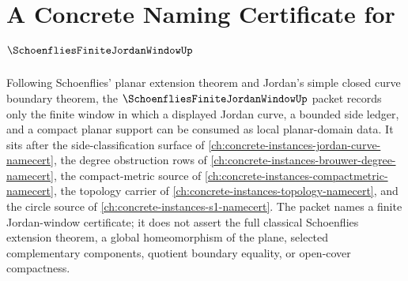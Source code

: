 \chapter{A Concrete Naming Certificate for $\SchoenfliesFiniteJordanWindowUp$}
\label{ch:concrete-instances-schoenflies-finite-jordan-window-namecert}

Following Schoenflies' planar extension theorem and Jordan's simple closed curve boundary theorem, the $\SchoenfliesFiniteJordanWindowUp$ packet records only the finite window in which a displayed Jordan curve, a bounded side ledger, and a compact planar support can be consumed as local planar-domain data. It sits after the side-classification surface of \autoref{ch:concrete-instances-jordan-curve-namecert}, the degree obstruction rows of \autoref{ch:concrete-instances-brouwer-degree-namecert}, the compact-metric source of \autoref{ch:concrete-instances-compactmetric-namecert}, the topology carrier of \autoref{ch:concrete-instances-topology-namecert}, and the circle source of \autoref{ch:concrete-instances-s1-namecert}. The packet names a finite Jordan-window certificate; it does not assert the full classical Schoenflies extension theorem, a global homeomorphism of the plane, selected complementary components, quotient boundary equality, or open-cover compactness.

